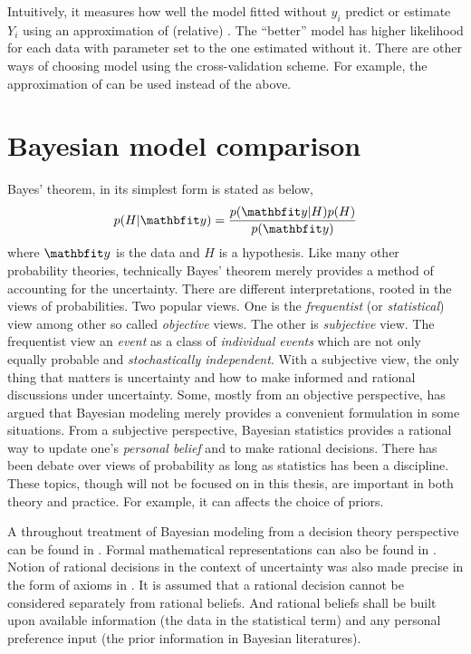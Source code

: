 Intuitively, it measures how well the model fitted without $y_i$ predict or
estimate $Y_i$ using an approximation of (relative) \kl. The ``better'' model
has higher likelihood for each data with parameter set to the one estimated
without it. There are other ways of choosing model using the cross-validation
scheme. For example, the \tic approximation of \kl can be used instead of the
above.

\section{Bayesian model comparison}
\label{sec:Bayesian model comparison}

Bayes' theorem, in its simplest form is stated as below,
\begin{equation}
  p(H|\data) = \frac{p(\data|H)p(H)}{p(\data)} \label{eq:bayes}
\end{equation}
where $\data$ is the data and $H$ is a hypothesis. Like many other probability
theories, technically Bayes' theorem merely provides a method of accounting
for the uncertainty. There are different interpretations, rooted in the views
of probabilities. Two popular views. One is the \emph{frequentist} (or
\emph{statistical}) view among other so called \emph{objective} views. The
other is \emph{subjective} view. The frequentist view an \emph{event} as a
class of \emph{individual events} which are not only equally probable and
\emph{stochastically independent}. With a subjective view, the only thing
that matters is uncertainty and how to make informed and rational discussions
under uncertainty. Some, mostly from an objective perspective, has argued that
Bayesian modeling merely provides a convenient formulation in some situations.
From a subjective perspective, Bayesian statistics provides a rational way to
update one's \emph{personal belief} and to make rational decisions. There has
been debate over views of probability as long as statistics has been a
discipline. These topics, though will not be focused on in this thesis, are
important in both theory and practice. For example, it can affects the choice
of priors.

A throughout treatment of Bayesian modeling from a decision theory perspective
can be found in \cite{Robert:2007tc}. Formal mathematical representations can
also be found in \cite[][sec.~5.1 and sec.~6.1]{Bernardo:1994vd}. Notion of
rational decisions in the context of uncertainty was also made precise in the
form of axioms in \cite{DeFinetti:1974tg,DeFinetti:1975ua}. It is assumed that
a rational decision cannot be considered separately from rational beliefs. And
rational beliefs shall be built upon available information (the data in the
statistical term) and any personal preference input (the prior information in
Bayesian literatures).

